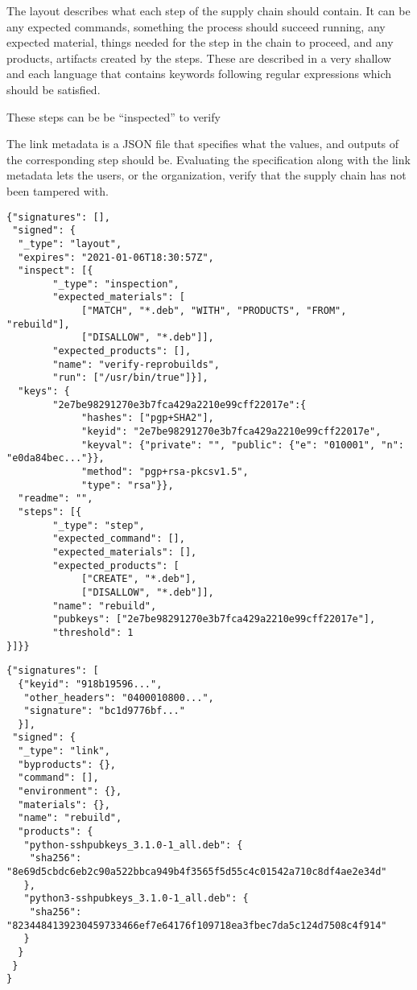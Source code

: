 \documentclass[../Main/thesis.tex]{subfiles}
\begin{document}
    The layout describes what each step of the supply chain should contain. It
    can be any expected commands, something the process should succeed running,
    any expected material, things needed for the step in the chain to proceed,
    and any products, artifacts created by the steps. These are described in a
    very shallow and each language that contains keywords following regular
    expressions which should be satisfied.

    These steps can be be ``inspected'' to verify 

    The link metadata is a JSON file that specifies what the values, and outputs
    of the corresponding step should be. Evaluating the specification along with
    the link metadata lets the users, or the organization, verify that the
    supply chain has not been tampered with. 

\begin{verbatim}
{"signatures": [],
 "signed": {
  "_type": "layout",
  "expires": "2021-01-06T18:30:57Z",
  "inspect": [{
        "_type": "inspection",
        "expected_materials": [
             ["MATCH", "*.deb", "WITH", "PRODUCTS", "FROM", "rebuild"],
             ["DISALLOW", "*.deb"]],
        "expected_products": [],
        "name": "verify-reprobuilds",
        "run": ["/usr/bin/true"]}],
  "keys": {
        "2e7be98291270e3b7fca429a2210e99cff22017e":{
             "hashes": ["pgp+SHA2"],
             "keyid": "2e7be98291270e3b7fca429a2210e99cff22017e",
             "keyval": {"private": "", "public": {"e": "010001", "n": "e0da84bec..."}},
             "method": "pgp+rsa-pkcsv1.5",
             "type": "rsa"}},
  "readme": "",
  "steps": [{
        "_type": "step",
        "expected_command": [],
        "expected_materials": [],
        "expected_products": [
             ["CREATE", "*.deb"],
             ["DISALLOW", "*.deb"]],
        "name": "rebuild",
        "pubkeys": ["2e7be98291270e3b7fca429a2210e99cff22017e"],
        "threshold": 1
}]}}
\end{verbatim}

\begin{verbatim}
{"signatures": [
  {"keyid": "918b19596...",
   "other_headers": "0400010800...",
   "signature": "bc1d9776bf..."
  }],
 "signed": {
  "_type": "link",
  "byproducts": {},
  "command": [],
  "environment": {},
  "materials": {},
  "name": "rebuild",
  "products": {
   "python-sshpubkeys_3.1.0-1_all.deb": {
    "sha256": "8e69d5cbdc6eb2c90a522bbca949b4f3565f5d55c4c01542a710c8df4ae2e34d"
   },
   "python3-sshpubkeys_3.1.0-1_all.deb": {
    "sha256": "8234484139230459733466ef7e64176f109718ea3fbec7da5c124d7508c4f914"
   }
  }
 }
}
\end{verbatim}
\end{document}
